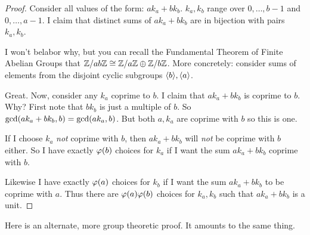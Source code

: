 \begin{proof}
  Consider all values of the form: $ak_a + bk_b$. $k_a, k_b$ range over
  $0,\ldots, b-1$ and $0,\ldots, a-1$. I claim that distinct sums of
  $ak_a + bk_b$ are in bijection with pairs $k_a, k_b$.

  I won't belabor why, but you can recall the Fundamental Theorem of
  Finite Abelian Groups that $\mathbb{Z} / ab\mathbb{Z} \cong \mathbb{Z} / a\mathbb{Z} \oplus \mathbb{Z} / b\mathbb{Z}$.
  More concretely: consider sums of elements from the disjoint cyclic
  subgroups $\langle b \rangle, \langle a \rangle$.

  Great. Now, consider any $k_a$ coprime to $b$. I claim that $ak_a +
  bk_b$ is coprime to $b$. Why? First note that $bk_b$ is just a
  multiple of $b$. So $\gcd\mathopen{}\left( {ak_a + bk_b, b} \right)\mathclose{} = \gcd\mathopen{}\left( {ak_a,
  b} \right)\mathclose{}$. But both $a, k_a$ are coprime with $b$ so this is one.

  If I choose $k_a$ \emph{not} coprime with $b$, then $ak_a + bk_b$ will
  \emph{not} be coprime with $b$ either. So I have exactly $\varphi\mathopen{}\left( {b} \right)\mathclose{}$
  choices for $k_a$ if I want the sum $ak_a + bk_b$ coprime with $b$.

  Likewise I have exactly $\varphi\mathopen{}\left( {a} \right)\mathclose{}$ choices for $k_b$ if I want the
  sum $ak_a + bk_b$ to be coprime with $a$. Thus there are
  $\varphi\mathopen{}\left( {a} \right)\mathclose{}\varphi\mathopen{}\left( {b} \right)\mathclose{}$ choices for $k_a, k_b$ such that $ak_a + bk_b$ is
  a unit.
\end{proof}

Here is an alternate, more group theoretic proof. It amounts to the same
thing.

